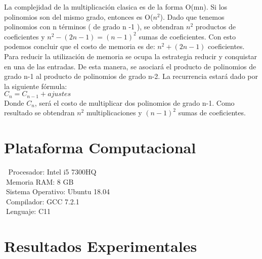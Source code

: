 La complejidad de la multiplicación clasica es de la forma O(mn). Si los polinomios son del mismo grado, entonces es O($n^2$). Dado que tenemos polinomios con n términos ( de grado n -1 ), se obtendran $n^2$ productos de coeficientes y $n^2 - (2n-1) = (n-1)^2$ sumas de coeficientes. Con esto podemos concluir que el costo de memoria es de: $n^2 + (2n -1 )$ coeficientes. Para reducir la utilización de memoria se ocupa la estrategia reducir y conquistar en una de las entradas. De esta manera, se asociará el producto de polinomios de grado n-1 al producto de polinomios de grado n-2.
La recurrencia estará dado por la siguiente fórmula:\\

$C_{n} = C_{n-1} + ajustes$\\

Donde $C_{n}$, será el costo de multiplicar dos polinomios de grado n-1. Como resultado se obtendran $n^2$ multiplicaciones y $(n-1)^2$ sumas de coeficientes.

\section{Plataforma Computacional}

 Procesador: Intel i5 7300HQ\\
 Memoria RAM: 8 GB\\
 Sistema Operativo: Ubuntu 18.04\\
 Compilador: GCC 7.2.1\\
 Lenguaje: C11 \\

  \newpage
\section{Resultados Experimentales}

